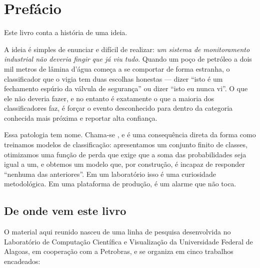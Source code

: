\chapter*{Prefácio}

Este livro conta a história de uma ideia.

A ideia é simples de enunciar e difícil de realizar: \emph{um sistema de monitoramento
industrial não deveria fingir que já viu tudo}. Quando um poço de petróleo a dois mil
metros de lâmina d'água começa a se comportar de forma estranha, o classificador que
o vigia tem duas escolhas honestas --- dizer ``isto é um fechamento espúrio da válvula
de segurança'' ou dizer ``isto eu nunca vi''. O que ele não deveria fazer, e no entanto
é exatamente o que a maioria dos classificadores faz, é forçar o evento desconhecido
para dentro da categoria conhecida mais próxima e reportar alta confiança.

Essa patologia tem nome. Chama-se , e é uma consequência direta da forma como treinamos modelos de
classificação: apresentamos um conjunto finito de classes, otimizamos uma função de
perda que exige que a soma das probabilidades seja igual a um, e obtemos um modelo
que, por construção, é incapaz de responder ``nenhuma das anteriores''. Em um
laboratório isso é uma curiosidade metodológica. Em uma plataforma de produção, é um
alarme que não toca.

\section*{De onde vem este livro}

O material aqui reunido nasceu de uma linha de pesquisa desenvolvida no Laboratório de
Computação Científica e Visualização da Universidade Federal de Alagoas, em cooperação
com a Petrobras, e se organiza em cinco trabalhos encadeados:


